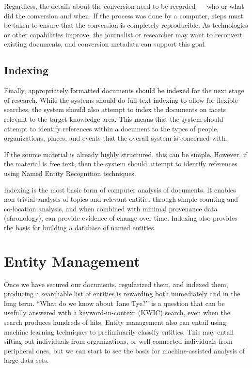 \documentclass[format=siggraph, review=true]{acmart}
\begin{document}
Regardless, the details about the conversion need to be recorded ---
who or what did the conversion and when. If the process was done by a
computer, steps must be taken to ensure that the conversion is
completely reproducible. As technologies or other capabilities
improve, the journalist or researcher may want to reconvert existing
documents, and conversion metadata can support this goal.

\subsection{Indexing}
Finally, appropriately formatted documents should be indexed for the
next stage of research. While the systems should do full-text indexing
to allow for flexible searches, the system should also attempt to
index the documents on facets relevant to the target knowledge
area. This means that the system should attempt to identify references
within a document to the types of people, organizations, places, and
events that the overall system is concerned with.

If the source material is already highly structured, this can be
simple. However, if the material is free text, then the system should
attempt to identify references using Named Entity Recognition
techniques. 

Indexing is the most basic form of computer analysis of documents. It
enables non-trivial analysis of topics and relevant entities through
simple counting and co-location analysis, and when combined with
minimal provenance data (chronology), can provide evidence of change
over time. Indexing also provides the basis for building a database
of named entities.

\section{Entity Management}

Once we have secured our documents, regularized them, and indexed
them, producing a searchable list of entities is rewarding both
immediately and in the long term. ``What do we know about Jane Tye?''
is a question that can be usefully answered with a keyword-in-context
(KWIC) search, even when the search produces hundreds of hits. Entity
management also can entail using machine learning techniques to
preliminarily classify entities. This may entail sifting out
individuals from organizations, or well-connected individuals from
peripheral ones, but we can start to see the basis for
machine-assisted analysis of large data sets.
\end{document}
